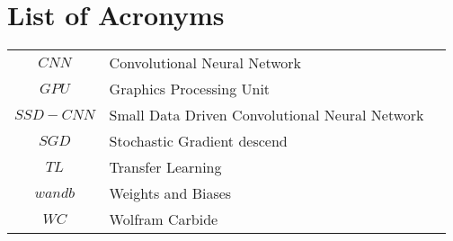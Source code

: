 \chapter*{List of Acronyms}

\begin{table}[!h]
	\begin{tabular}{cll}
		$CNN$ & Convolutional Neural Network \\
		$GPU$ & Graphics Processing Unit \\
		$SSD-CNN$ & Small Data Driven Convolutional Neural Network \\
		$SGD$ & Stochastic Gradient descend \\
		$TL$ & Transfer Learning \\
		$wandb$ & Weights and Biases \\
		$WC$ & Wolfram Carbide \\
	\end{tabular}
\end{table}
